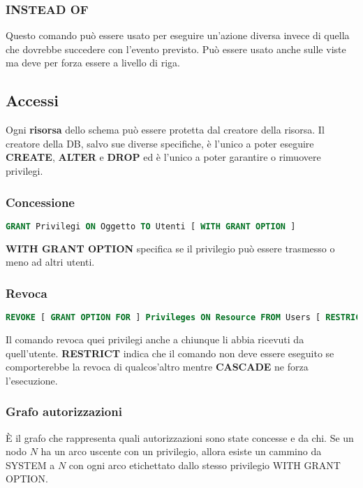 \subsubsection{INSTEAD OF}
Questo comando può essere usato per eseguire un'azione diversa invece di quella che dovrebbe succedere con l'evento previsto. Può essere usato anche sulle viste ma deve per forza essere a livello di riga.

\newpage
\subsection{Accessi}
Ogni \textbf{risorsa} dello schema può essere protetta dal creatore della risorsa. Il creatore della DB, salvo sue diverse specifiche, è l'unico a poter eseguire \textbf{CREATE}, \textbf{ALTER} e \textbf{DROP} ed è l'unico a poter garantire o rimuovere privilegi.

\subsubsection{Concessione}
\begin{lstlisting}[language=SQL]
	GRANT Privilegi ON Oggetto TO Utenti [ WITH GRANT OPTION ]
\end{lstlisting}
\textbf{WITH GRANT OPTION} specifica se il privilegio può essere trasmesso o meno ad altri utenti.

\subsubsection{Revoca}
\begin{lstlisting}[language=SQL]
	REVOKE [ GRANT OPTION FOR ] Privileges ON Resource FROM Users [ RESTRICT | CASCADE ]
\end{lstlisting}
Il comando revoca quei privilegi anche a chiunque li abbia ricevuti da quell'utente. \textbf{RESTRICT} indica che il comando non deve essere eseguito se comporterebbe la revoca di qualcos'altro mentre \textbf{CASCADE} ne forza l'esecuzione.

\subsubsection{Grafo autorizzazioni}
È il grafo che rappresenta quali autorizzazioni sono state concesse e da chi. Se un nodo $N$ ha un arco uscente con un privilegio, allora esiste un cammino da SYSTEM a $N$ con ogni arco etichettato dallo stesso privilegio WITH GRANT OPTION.

